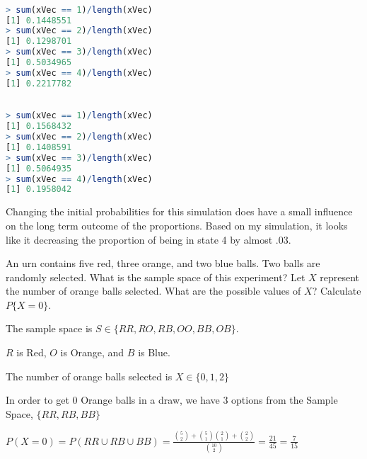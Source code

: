 \documentclass[12pt]{article}
\newenvironment{problem}[2][Problem]{\begin{trivlist}
\item[\hskip \labelsep {\bfseries #1}\hskip \labelsep {\bfseries #2.}]}{\end{trivlist}}
\newenvironment{sol}
    {\emph{Solution:}
    }
    {
    \qed
    }
\begin{document}




\begin{problem}{1a}

\begin{lstlisting}[language = R]

> sum(xVec == 1)/length(xVec)
[1] 0.1448551
> sum(xVec == 2)/length(xVec)
[1] 0.1298701
> sum(xVec == 3)/length(xVec)
[1] 0.5034965
> sum(xVec == 4)/length(xVec)
[1] 0.2217782

\end{lstlisting}

\end{problem}
\begin{problem}{1b}

\begin{lstlisting}[language = R]

> sum(xVec == 1)/length(xVec)
[1] 0.1568432
> sum(xVec == 2)/length(xVec)
[1] 0.1408591
> sum(xVec == 3)/length(xVec)
[1] 0.5064935
> sum(xVec == 4)/length(xVec)
[1] 0.1958042
\end{lstlisting}

Changing the initial probabilities for this simulation does have a small influence on the long term outcome of the proportions. Based on my simulation, it looks like it decreasing the proportion of being in state 4 by almost .03.
\end{problem}

\begin{problem}{2 (Chapter 2, Problem 1)}
An urn contains five red, three orange, and two blue balls. Two balls are randomly selected. What is the sample space of this experiment? Let $X$ represent the number of orange balls selected. What are the possible values of $X$? Calculate $P\{X = 0\}$.

The sample space is $S\in\{RR, RO, RB, OO, BB, OB\}$.

$R$ is Red, $O$ is Orange, and $B$ is Blue.

The number of orange balls selected is $X\in\{0, 1, 2\}$

In order to get 0 Orange balls in a draw, we have 3 options from the Sample Space, $\{RR, RB, BB\}$

$P(X=0) = P(RR \cup RB \cup BB) = \frac{\binom{5}{2} + \binom{5}{1}\binom{2}{1} + \binom{2}{2}}{\binom{10}{2}} = \frac{21}{45} = \frac{7}{15}$


\end{problem}


\end{document}
